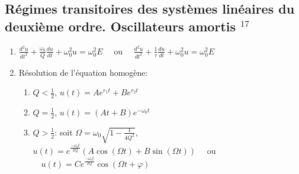 \documentclass[fleqn]{article}
\theoremstyle{definition} \newtheorem*{defi}{D\'efinition}
\theoremstyle{definition} \newtheorem*{theo}{Th\'eor\`eme}
\theoremstyle{definition} \newtheorem*{coro}{Corollaire}
\theoremstyle{remark} \newtheorem*{rqs}{Remarques}
\theoremstyle{definition} \newtheorem*{prop}{Propri\'et\'e}
\begin{document}
\subsection{R\'egimes transitoires des syst\`emes lin\'eaires du deuxi\`eme ordre. Oscillateurs amortis $^{17}$}
\begin{enumerate}
	\item $\frac{d^2u}{dt^2} + \frac{\omega_0}{Q} \frac{du}{dt} + \omega_0^2 u = \omega_0^2 E\quad$ ou
		$\quad \frac{d^2u}{dt^2} + \frac{1}{\tau} \frac{du}{dt} + \omega_0^2 u = \omega_0^2 E$
	\item R\'esolution de l'\'equation homog\`ene:
		\begin{enumerate}
			\item $Q < \frac{1}{2}$, $u(t) = Ae^{r_1 t} + B e^{r_2 t}$
			\item $Q = \frac{1}{2}$, $u(t) = (At + B)e^{-\omega_0 t}$
			\item $Q > \frac{1}{2}$: soit $\Omega = \omega_0 \sqrt{1 - \frac{1}{4Q^2}}$,
				\\ $u(t) = e^{\frac{-\omega_0 t}{2Q}}(A\cos(\Omega t) + B\sin(\Omega t))\quad$ ou
				$\quad u(t) = C e^{\frac{-\omega_0 t}{2Q}} \cos(\Omega t + \varphi)$
		\end{enumerate}
\end{enumerate}
\end{document}
